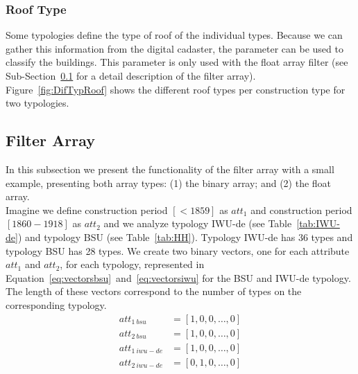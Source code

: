 \documentclass[authoryear,preprint,review,12pt]{elsarticle}
\begin{document}
\begin{linenumbers}



\subsubsection{Roof Type}

Some typologies define the type of roof of the individual types.
Because we can gather this information from the digital cadaster, the parameter
can be used to classify the buildings.  This parameter is only used with the
float array filter (see Sub-Section~\ref{sub-sec:filter} for a detail
description of the filter array). Figure~\ref{fig:DifTypRoof} shows the
different roof types per construction type for two typologies.\\


 
\subsection{Filter Array}\label{sub-sec:filter}

In this subsection we present the functionality of the filter array with a
small example, presenting both array types: (1) the binary array; and (2) the
float array.\\

Imagine we define construction period $[<1859]$ as $att_1$ and construction
period $[1860 - 1918]$ as $att_2$ and we analyze typology IWU-de (see
Table~\ref{tab:IWU-de}) and typology BSU (see Table~\ref{tab:HH}).  Typology
IWU-de has 36 types and typology BSU has 28 types. 
We create two binary vectors, one for each attribute $att_1$ and $att_2$, for
each typology, represented in
Equation~\ref{eq:vectorsbsu}~and~\ref{eq:vectorsiwu} for the BSU and IWU-de
typology. The length of these vectors correspond to the number of types on the
corresponding typology.\\

\begin{align} \label{eq:vectorsbsu}
att_{1~bsu}    &= [1, 0, 0, \dots, 0] \nonumber \\
att_{2~bsu}    &= [1, 0, 0, \dots, 0] \\ \label{eq:vectorsiwu}
att_{1~iwu-de} &= [1, 0, 0, \dots, 0] \nonumber \\
att_{2~iwu-de} &= [0, 1, 0, \dots, 0]
\end{align}


\end{linenumbers}
\end{document}
